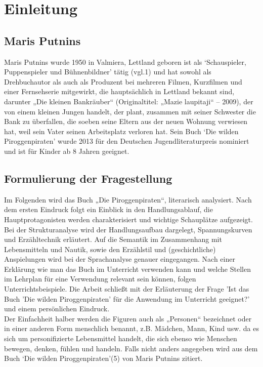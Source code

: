 \chapter{Einleitung}

\section{Maris Putnins}
Maris Putnins wurde 1950 in Valmiera, Lettland geboren ist als `Schauspieler, Puppenspieler und Bühnenbildner' 
tätig (vgl.1) und hat sowohl als Drehbuchautor als auch als Produzent bei mehreren Filmen, Kurzfilmen und einer 
Fernsehserie mitgewirkt, die hauptsächlich in Lettland bekannt  sind, \cite{jlib} darunter „Die kleinen Bankräuber“ 
(Originaltitel: „Mazie laupitaji“ – 2009), der von einem kleinen Jungen handelt, der plant, zusammen mit seiner 
Schwester die Bank zu überfallen, die soeben seine Eltern aus der neuen Wohnung verwiesen hat, weil sein Vater 
seinen Arbeitsplatz verloren hat. \cite{imdb}
Sein Buch `Die wilden Piroggenpiraten' wurde 2013 für den Deutschen Jugendliteraturpreis nominiert und ist für Kinder 
ab 8 Jahren geeignet. \cite{imdb2}

\section{Formulierung der Fragestellung}
Im Folgenden wird das Buch „Die Piroggenpiraten“, literarisch analysiert. Nach dem ersten Eindruck folgt ein
Einblick in den Handlungsablauf, die Hauptprotagonisten werden charakterisiert und wichtige Schauplätze aufgezeigt. 
Bei der Strukturanalyse wird der Handlungsaufbau dargelegt, Spannungskurven und Erzähltechnik erläutert. 
Auf die Semantik im Zusammenhang mit Lebensmitteln und Nautik, sowie 
den Erzählstil und (geschichtliche) Anspielungen wird bei der Sprachanalyse genauer eingegangen. Nach einer Erklärung wie man das Buch im Unterricht verwenden kann und welche Stellen im Lehrplan für eine Verwendung relevant sein können, folgen Unterrichtsbeispiele. Die Arbeit schließt mit der Erläuterung der Frage 'Ist das Buch 'Die wilden Piroggenpiraten' für die Anwendung im Unterricht geeignet?' und einem persönlichen Eindruck.
\\
Der Einfachheit halber werden die Figuren auch als „Personen“ bezeichnet oder in einer anderen 
Form menschlich benannt, z.B. Mädchen, Mann, Kind usw. da es sich um personifizierte Lebensmittel handelt, die sich ebenso wie Menschen bewegen, denken, fühlen und handeln. Falls nicht anders angegeben wird aus dem 
Buch `Die wilden Piroggenpiraten'(5) von Maris Putnins zitiert.

